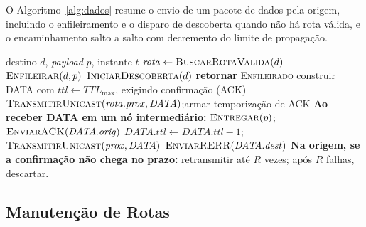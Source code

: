 O Algoritmo~\ref{alg:dados} resume o envio de um pacote de dados pela
origem, incluindo o enfileiramento e o disparo de descoberta quando não
há rota válida, e o encaminhamento salto a salto com decremento do limite
de propagação.

\begin{algorithm}[H]
\caption{Envio e encaminhamento de DATA}\label{alg:dados}
\begin{algorithmic}[1]
\Require destino $d$, \emph{payload} $p$, instante $t$
\State $\mathit{rota} \gets \Call{BuscarRotaValida}{d}$
  \State $\Call{Enfileirar}{d, p}$ 
  \State $\Call{IniciarDescoberta}{d}$ 
  \State \textbf{retornar} \textsc{Enfileirado}
\EndIf
\State construir DATA com $\mathit{ttl} \gets \mathit{TTL}_{\max}$, exigindo confirmação (ACK)
\State $\Call{TransmitirUnicast}{\mathit{rota}.\mathit{prox}, \mathit{DATA}}$;\quad armar temporização de ACK
\Statex \textbf{Ao receber DATA em um nó intermediário:}
  \State $\Call{Entregar}{p}$;\quad $\Call{EnviarACK}{\mathit{DATA}.\mathit{orig}}$
  \State $\mathit{DATA}.\mathit{ttl} \gets \mathit{DATA}.\mathit{ttl} - 1$;\quad $\Call{TransmitirUnicast}{\mathit{prox}, \mathit{DATA}}$
\Else
  \State $\Call{EnviarRERR}{\mathit{DATA}.\mathit{dest}}$ 
\EndIf
\Statex \textbf{Na origem, se a confirmação não chega no prazo:} retransmitir até $R$ vezes; após $R$ falhas, descartar.
\end{algorithmic}
\end{algorithm}

\subsection{Manutenção de Rotas}\label{manutenuxe7uxe3o-de-rotas}

